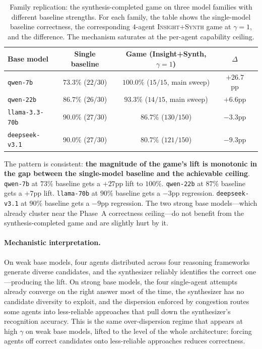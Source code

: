 \documentclass[11pt]{amsart}
\newcommand{\g}{\gamma}
\newcommand\1{{\mathds{1}}}
\theoremstyle{definition}
\theoremstyle{remark}
\numberwithin{equation}{section}
\begin{document}
\begin{table}[h]
\centering\small
\caption{Family replication: the synthesis-completed game on three model families with different baseline strengths. For each family, the table shows the single-model baseline correctness, the corresponding $4$-agent \textsc{Insight+Synth} game at $\g\!=\!1$, and the difference. The mechanism saturates at the per-agent capability ceiling.}
\label{tab:ceiling}
\begin{tabular}{lcccc}
\toprule
Base model & Single baseline & Game (Insight+Synth, $\g\!=\!1$) & $\Delta$ \\
\midrule
\texttt{qwen-7b}        & $73.3\%$ ($22/30$) & $\mathbf{100.0\%}$ ($15/15$, main sweep) & $\mathbf{+26.7}$pp \\
\texttt{qwen-22b}       & $86.7\%$ ($26/30$) & $93.3\%$ ($14/15$, main sweep)           & $+6.6$pp \\
\texttt{llama-3.3-70b}  & $90.0\%$ ($27/30$) & $86.7\%$ ($130/150$)                     & $-3.3$pp \\
\texttt{deepseek-v3.1}  & $90.0\%$ ($27/30$) & $80.7\%$ ($121/150$)                     & $-9.3$pp \\
\bottomrule
\end{tabular}
\end{table}

The pattern is consistent: \textbf{the magnitude of the game's lift is monotonic in the gap between the single-model baseline and the achievable ceiling}.
\texttt{qwen-7b} at $73\%$ baseline gets a $+27$pp lift to $100\%$.
\texttt{qwen-22b} at $87\%$ baseline gets a $+7$pp lift.
\texttt{llama-70b} at $90\%$ baseline gets a $-3$pp regression.
\texttt{deepseek-v3.1} at $90\%$ baseline gets a $-9$pp regression.
The two strong base models---which already cluster near the Phase~A correctness ceiling---do not benefit from the synthesis-completed game and are slightly hurt by it.

\paragraph{Mechanistic interpretation.}
On weak base models, four agents distributed across four reasoning frameworks generate diverse candidates, and the synthesizer reliably identifies the correct one---producing the lift.
On strong base models, the four single-agent attempts already converge on the right answer most of the time, the synthesizer has no candidate diversity to exploit, and the dispersion enforced by congestion routes some agents into less-reliable approaches that pull down the synthesizer's recognition accuracy.
This is the same over-dispersion regime that appears at high $\g$ on weak base models, lifted to the level of the whole architecture: forcing agents off correct candidates onto less-reliable approaches reduces correctness.
\end{document}
